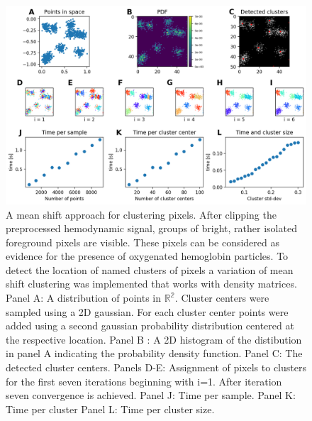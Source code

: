 \begin{figure}[th]
\centering
\includegraphics[width=\textwidth,height=\textheight,keepaspectratio]{Figures/clustering_approach_properties}
\decoRule
\caption[A mean shift approach for clustering pixels]{A mean shift approach for clustering pixels. After clipping the preprocessed hemodynamic signal, groups of bright, rather isolated foreground pixels are visible. These pixels can be considered as evidence for the presence of oxygenated hemoglobin particles. To detect the location of named clusters of pixels a variation of mean shift clustering was implemented that works with density matrices. Panel A: A distribution of points in $\mathbb{R^2}$. Cluster centers were sampled using a 2D gaussian. For each cluster center points were added using a second gaussian probability distribution centered at the respective location. Panel B : A 2D histogram of the distibution in panel A indicating the probability density function. Panel C: The detected cluster centers. Panels D-E: Assignment of pixels to clusters for the first seven iterations beginning with i=1. After iteration seven convergence is achieved. Panel J: Time per sample. Panel K: Time per cluster Panel L: Time per cluster size. }
\label{fig:clustering_approach_properties}
\end{figure}
